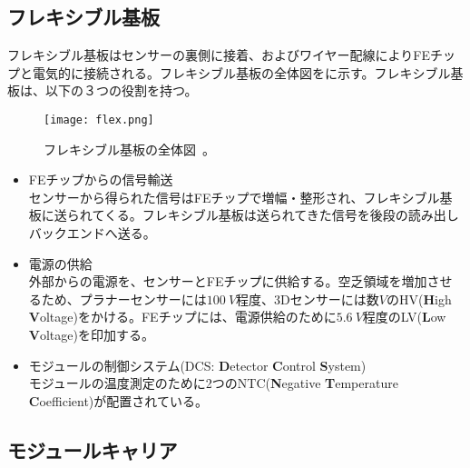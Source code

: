 

\subsection{フレキシブル基板}
\label{sec:flex}

フレキシブル基板はセンサーの裏側に接着、およびワイヤー配線によりFEチップと電気的に接続される。フレキシブル基板の全体図をに示す。フレキシブル基板は、以下の３つの役割を持つ。

\begin{figure}[tbp]
  \centering
  \texttt{[image: flex.png]}
  \caption[フレキシブル基板]{フレキシブル基板の全体図\ \cite{itk}。}
  \label{fig:flex}
\end{figure}

\begin{itemize}
  \item FEチップからの信号輸送  \\
  センサーから得られた信号はFEチップで増幅・整形され、フレキシブル基板に送られてくる。フレキシブル基板は送られてきた信号を後段の読み出しバックエンドへ送る。
  \item 電源の供給 \\
  外部からの電源を、センサーとFEチップに供給する。空乏領域を増加させるため、プラナーセンサーには$100\ \si{V}$程度、3Dセンサーには数$\si{V}$のHV(\textbf{H}igh \textbf{V}oltage)をかける。FEチップには、電源供給のために$5.6\ \si{V}$程度のLV(\textbf{L}ow \textbf{V}oltage)を印加する。
  \item モジュールの制御システム(DCS: \textbf{D}etector \textbf{C}ontrol \textbf{S}ystem) \\
  モジュールの温度測定のために2つのNTC(\textbf{N}egative \textbf{T}emperature \textbf{C}oefficient)が配置されている。
\end{itemize}

\subsection{モジュールキャリア}
\label{sec:carrier}


